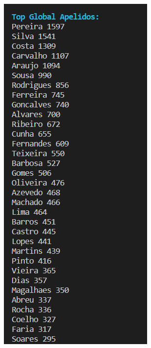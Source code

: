 \documentclass[11pt,a4paper]{report}
\begin{document}
\begin{center}
	\includegraphics[scale=0.6]{images/b3}
	\end{center}
\end{document}
